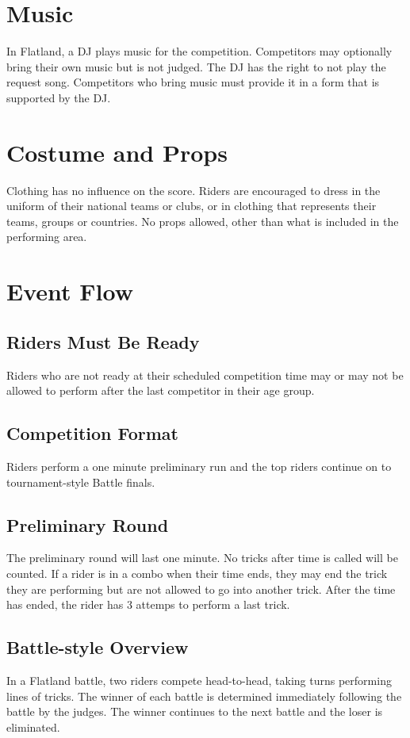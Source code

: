 \section{Music}

In Flatland, a DJ plays music for the competition.
Competitors may optionally bring their own music but is not judged.
The DJ has the right to not play the request song.
Competitors who bring music must provide it in a form that is supported by the DJ.

\section{Costume and Props}
Clothing has no influence on the score.
Riders are encouraged to dress in the uniform of their national teams or clubs, or in clothing that represents their teams, groups or countries.
No props allowed, other than what is included in the performing area.

\section{Event Flow}

\subsection{Riders Must Be Ready}

Riders who are not ready at their scheduled competition time may or may not be allowed to perform after the last competitor in their age group.

\subsection{Competition Format}
Riders perform a one minute preliminary run and the top riders continue on to tournament-style Battle finals.

\subsection{Preliminary Round}

The preliminary round will last one minute.
No tricks after time is called will be counted.
If a rider is in a combo when their time ends, they may end the trick they are performing but are not allowed to go into another trick.
After the time has ended, the rider has 3 attemps to perform a last trick.

\subsection{Battle-style Overview}
In a Flatland battle, two riders compete head-to-head, taking turns performing lines of tricks.
The winner of each battle is determined immediately following the battle by the judges.
The winner continues to the next battle and the loser is eliminated.

